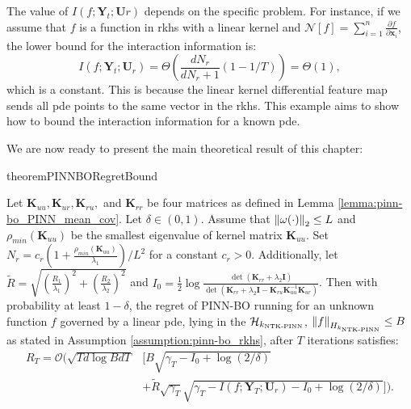 \begin{remark}
The value of $I(f; \mathbf{Y}_t; \mathbf{U}r)$ depends on the specific problem. For instance, if we assume that $f$ is a function in \ac{rkhs} with a linear kernel and $\mathcal{N}[f]= \sum_{i=1}^n \frac{\partial f}{\partial \mathbf{x}_i}$, the lower bound for the interaction information is: \[
I(f; \mathbf{Y}_t; \mathbf{U}_r) = \Theta\left(\frac{d N_r}{d N_r+1}(1-1/T)\right) = \Theta(1),
\] 
which is a constant. This is because the linear kernel differential feature map sends all \ac{pde} points to the same vector in the \ac{rkhs}. This example aims to show how to bound the interaction information for a known \ac{pde}. 
\end{remark}
We are now ready to present the main theoretical result of this chapter: 
\begin{restatable}{theorem}{PINNBORegretBound}
\label{theorem:pinn-bo_main}

Let $\mathbf{K}_{uu}, \mathbf{K}_{ur}, \mathbf{K}_{ru},$ and $\mathbf{K}_{rr}$ be four matrices as defined in Lemma \ref{lemma:pinn-bo_PINN_mean_cov}. 
Let $\delta \in (0,1)$. Assume that $\norm{\omega(\cdot)}_2 \le L$ and  $\rho_{min}(\mathbf{K}_{uu})$ be the smallest eigenvalue of kernel matrix $\mathbf{K}_{uu}$. Set $N_r = c_r\left(1+ \frac{\rho_{min}(\mathbf{K}_{uu})}{\lambda_1}\right)/L^2$ for a constant $c_r > 0$. Additionally,  let $\widetilde{R} = \sqrt{\left(\frac{R_1}{\lambda_1}\right)^2 + \left(\frac{R_2}{\lambda_2}\right)^2}$ and $I_0 = \frac{1}{2}\log \frac{\det(\mathbf{K}_{rr} + \lambda_2\mathbf{I})}{\det(\mathbf{K}_{rr} + \lambda_2\mathbf{I} - \mathbf{K}_{ru} \mathbf{K}_{uu}^{-1} \mathbf{K}_{ur})}$. Then with probability at least $1-\delta$, the regret of PINN-BO running for an unknown function $f$ governed by a linear \ac{pde}, lying in the $\mathcal{H}_{k_\textup{NTK-PINN}}$, $\norm{f}_{{H}_{k_\textup{NTK-PINN}}} \le B$ as stated in Assumption \ref{assumption:pinn-bo_rkhs}, after $T$ iterations satisfies:
\begin{equation*}
    \begin{aligned}
        R_T  = \mathcal{O} \Bigg(\sqrt{T d\log BdT} &\bigg[B \sqrt{\gamma_T - I_0 + \log(2/\delta)} 
        \\
        & + \widetilde{R} \sqrt{\gamma_T} \sqrt{\gamma_T - I (f; \mathbf{Y}_T; \mathbf{U}_r) - I_0 + \log(2/\delta
        )} \bigg] \Bigg).
    \end{aligned}
\end{equation*}
\end{restatable}


